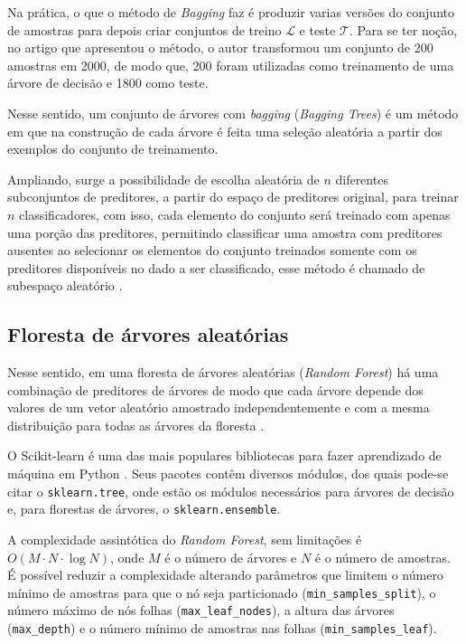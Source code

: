 \documentclass{article}
\begin{document}
Na prática, o que o método de \emph{Bagging} faz é produzir varias versões do conjunto de amostras para depois criar conjuntos de treino $\mathcal{L}$ e teste $\mathcal{T}$. Para se ter noção, no artigo que apresentou o método, o autor transformou um conjunto de 200 amostras em 2000, de modo que, 200 foram utilizadas como treinamento de uma árvore de decisão e 1800 como teste.

Nesse sentido, um conjunto de árvores com \textit{bagging} (\textit{Bagging Trees}) é um método em que na construção de cada árvore é feita uma seleção aleatória a partir dos exemplos do conjunto de treinamento. 

Ampliando, surge a possibilidade de escolha aleatória de $n$ diferentes subconjuntos de preditores, a partir do espaço de preditores original, para treinar $n$ classificadores, com isso, cada elemento do conjunto será treinado com apenas uma porção das preditores, permitindo classificar uma amostra com preditores ausentes ao selecionar os elementos do conjunto treinados somente com os preditores disponíveis no dado a ser classificado, esse método é chamado de subespaço aleatório \cite{polikar2010}. 

\subsection{Floresta de árvores aleatórias}

Nesse sentido, em uma floresta de árvores aleatórias (\textit{Random Forest}) há uma combinação de preditores de árvores de modo que cada árvore depende dos valores de um vetor aleatório amostrado independentemente e com a mesma distribuição para todas as árvores da floresta \cite{Breiman_2001}.

O Scikit-learn \cite{scikit-learn} é uma das mais populares bibliotecas para fazer aprendizado de máquina em Python \cite{Grus_2019}. Seus pacotes contêm diversos módulos, dos quais pode-se citar o \texttt{sklearn.tree}, onde estão os módulos necessários para árvores de decisão e, para florestas de árvores, o \texttt{sklearn.ensemble}.

A complexidade assintótica do \emph{Random Forest}, sem limitações é $O(M\cdot N \cdot\log{N})$, onde $M$ é o número de árvores e $N$ é o número de amostras. É possível reduzir a complexidade alterando parâmetros que limitem o número mínimo de amostras para que o nó seja particionado (\texttt{min\_samples\_split}), o número máximo de nós folhas (\texttt{max\_leaf\_nodes}), a altura das árvores (\texttt{max\_depth}) e o número mínimo de amostras nas folhas (\texttt{min\_samples\_leaf}).
\end{document}
